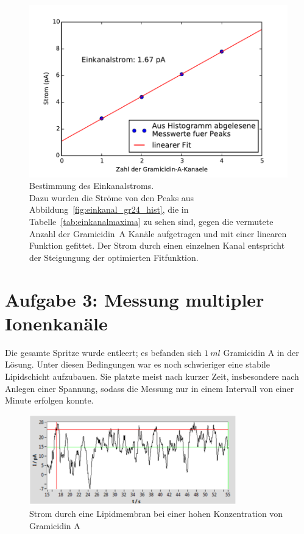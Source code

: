 \documentclass[a4paper,ngerman]{scrartcl}
\begin{document}
\begin{figure}[tbh!]
  \centering
  \includegraphics[width=.7\textwidth]{abbildungen/a2_linfit.pdf}
  \caption{Bestimmung des Einkanalstroms.\\ 
    Dazu wurden die Ströme von den Peaks aus Abbildung~\ref{fig:einkanal_gr24_hist}, die in Tabelle~\ref{tab:einkanalmaxima} zu sehen sind,
    gegen die vermutete Anzahl der Gramicidin~A Kanäle aufgetragen und mit einer linearen Funktion gefittet. Der Strom durch einen einzelnen Kanal 
    entspricht der Steigungung der optimierten Fitfunktion.}
  \label{fig:einkanalfit}
\end{figure}
\clearpage

\section{Aufgabe 3: Messung multipler Ionenkanäle}

Die gesamte Spritze wurde entleert; es befanden sich $\SI{1}{ml}$ Gramicidin A in der Lösung. Unter diesen Bedingungen war es noch schwieriger eine stabile Lipidschicht aufzubauen.
Sie platzte meist nach kurzer Zeit, insbesondere nach Anlegen einer Spannung, sodass die Messung nur in einem Intervall von einer Minute erfolgen konnte.

\begin{figure}[tbh!]
\includegraphics[width=0.8\textwidth]{abbildungen/mehrkanal_raw.png}
\caption{Strom durch eine Lipidmembran bei einer hohen Konzentration von Gramicidin A}
\label{fig:mehrkanal-roh}
\end{figure}
\end{document}
